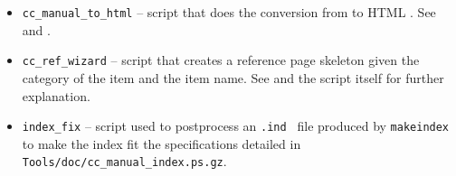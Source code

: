 \begin{itemize}
   \item \verb|cc_manual_to_html|%
         -- script that does the conversion from  
            to HTML%
            .  
            See %
         and .
   \item \verb|cc_ref_wizard|%
         -- script that creates a reference page skeleton%
         given the category of the item and the item name. See
         and the script itself for further explanation.
   \item \verb|index_fix|%
         -- script used to postprocess an {\tt .ind } file 
         produced by {\tt makeindex} to make the index fit the specifications
         detailed in %
         {{\tt Tools/doc/cc\_manual\_index.ps.gz}}.
\end{itemize}



